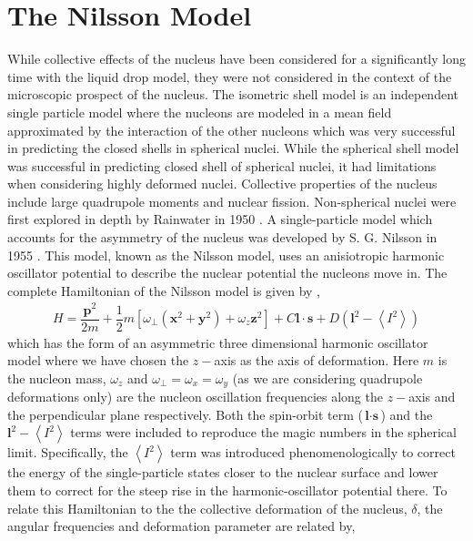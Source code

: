 \documentclass[10pt,a4paper, twoside, openright]{report}
\begin{document}
\section{The Nilsson Model}
While collective effects of the nucleus have been considered for a significantly long time with the liquid drop model, they were not considered in the context of the microscopic prospect of the nucleus. The isometric shell model is an independent single particle model where the nucleons are modeled in a mean field approximated by the interaction of the other nucleons which was very successful in predicting the closed shells in spherical nuclei\cite{Mayer1949, Jensen1949}. While the spherical shell model was successful in predicting closed shell of spherical nuclei, it had limitations when considering highly deformed nuclei. Collective properties of the nucleus include large quadrupole moments and nuclear fission. Non-spherical nuclei were first explored in depth by Rainwater in 1950 \cite{Rainwater1950}. A single-particle model which accounts for the asymmetry of the nucleus was developed by S. G. Nilsson in 1955 \cite{Nilsson1955}. This model, known as the Nilsson model, uses an anisiotropic harmonic oscillator potential to describe the nuclear potential the nucleons move in. The complete Hamiltonian of the Nilsson model is given by \cite{Nilsson1955, Gustafson1967},
\begin{align} \label{eq:NilssonHamiltonian}
H = \dfrac{\textbf{p}^2}{2m} + \dfrac{1}{2}m \left[\omega_{\perp}\left(\textbf{x}^2 + \textbf{y}^2\right) + \omega_z \textbf{z}^2\right] + C\textbf{l}\cdot \textbf{s} + D \left(\textbf{l}^2 - \left<I^2\right>\right)
\end{align}
which has the form of an asymmetric three dimensional harmonic oscillator model where we have chosen the $z-$axis as the axis of deformation. Here $m$ is the nucleon mass, $\omega_z$ and $\omega_{\perp} = \omega_x = \omega_y$ (as we are considering quadrupole deformations only) are the nucleon oscillation frequencies along the $z-$axis and the perpendicular  plane respectively.  Both the spin-orbit term ($\textbf{l}\cdot \textbf{s}$) and the  $\textbf{l}^2 - \left<I^2\right>$ terms were included to reproduce the magic numbers in the spherical limit. Specifically, the $\left<I^2\right>$  term was introduced phenomenologically to correct the energy of the single-particle states closer to the nuclear surface and lower them to correct for the steep rise in the harmonic-oscillator potential there. 	To relate this Hamiltonian to the the collective deformation of the nucleus, $\delta$, the angular frequencies and deformation parameter are related by,
\end{document}
